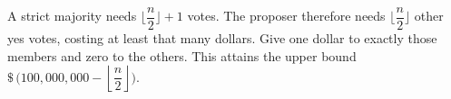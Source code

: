 A strict majority needs $\lfloor \dfrac{n}{2}\rfloor+1$ votes. The proposer therefore needs $\lfloor \dfrac{n}{2}\rfloor$ other yes votes, costing at least that many dollars. Give one dollar to exactly those members and zero to the others. This attains the upper bound $\boxed{\$\,\bigl(100{,}000{,}000-\left\lfloor \dfrac n2\right\rfloor\bigr)}$.
